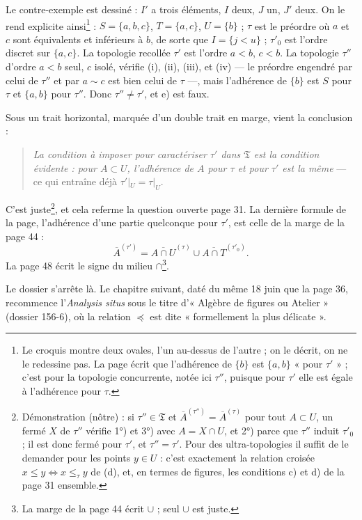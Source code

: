 \documentclass[11pt,a4paper]{article}
\begin{document}
Le contre-exemple est dessiné : $I'$ a trois éléments, $I$ deux, $J$ un, $J'$
deux. On le rend explicite ainsi\footnote{Le croquis montre deux ovales, l'un
au-dessus de l'autre ; on le décrit, on ne le redessine pas. La page écrit que
l'adhérence de $\{b\}$ est $\{a, b\}$ « pour $\tau'$ » ; c'est pour la topologie
concurrente, notée ici $\tau''$, puisque pour $\tau'$ elle est égale à
l'adhérence pour $\tau$.} : $S = \{a, b, c\}$, $T = \{a, c\}$, $U = \{b\}$ ;
$\tau$ est le préordre où $a$ et $c$ sont équivalents et inférieurs à $b$, de
sorte que $I = \{j < u\}$ ; $\tau'_{0}$ est l'ordre discret sur $\{a, c\}$. La
topologie recollée $\tau'$ est l'ordre $a < b$, $c < b$. La topologie $\tau''$
d'ordre $a < b$ seul, $c$ isolé, vérifie (i), (ii), (iii), et (iv) --- le
préordre engendré par celui de $\tau''$ et par $a \sim c$ est bien celui de
$\tau$ ---, mais l'adhérence de $\{b\}$ est $S$ pour $\tau$ et $\{a, b\}$ pour
$\tau''$. Donc $\tau'' \neq \tau'$, et e) est faux.

Sous un trait horizontal, marquée d'un double trait en marge, vient la
conclusion :

\begin{quote}
\emph{La condition à imposer pour caractériser $\tau'$ dans $\mathfrak{T}$ est
la condition évidente : pour $A \subset U$, l'adhérence de $A$ pour $\tau$ et
pour $\tau'$ est la même} --- ce qui entraîne déjà $\tau'|_{U} = \tau|_{U}$.
\end{quote}

C'est juste\footnote{Démonstration (nôtre) : si $\tau'' \in \mathfrak{T}$ et
$\overline{A}^{(\tau'')} = \overline{A}^{(\tau)}$ pour tout $A \subset U$, un
fermé $X$ de $\tau''$ vérifie 1°) et 3°) avec $A = X \cap U$, et 2°) parce que
$\tau''$ induit $\tau'_{0}$ ; il est donc fermé pour $\tau'$, et $\tau'' =
\tau'$. Pour des ultra-topologies il suffit de le demander pour les points $y
\in U$ : c'est exactement la relation croisée $x \leq y \iff x \leq_{\tau} y$
de (d), et, en termes de figures, les conditions c) et d) de la page 31
ensemble.}, et cela referme la question ouverte page 31. La dernière formule de
la page, l'adhérence d'une partie quelconque pour $\tau'$, est celle de la
marge de la page 44 :
\[
\overline{A}^{(\tau')} = \overline{A \cap U}^{(\tau)} \cup \overline{A \cap
T}^{(\tau'_{0})} .
\]
La page 48 écrit le signe du milieu $\cap$\footnote{La marge de la page 44
écrit $\cup$ ; seul $\cup$ est juste.}.

Le dossier s'arrête là. Le chapitre suivant, daté du même 18 juin que la
page 36, recommence l'\emph{Analysis situs} sous le titre d'« Algèbre de
figures ou Atelier » (dossier 156-6), où la relation $\preccurlyeq$ est dite
« formellement la plus délicate ».
\end{document}
